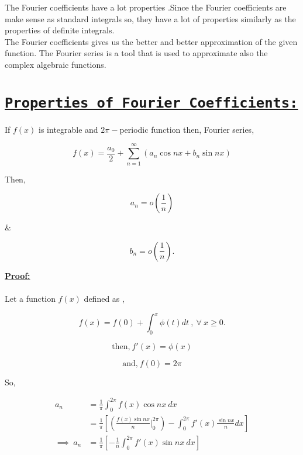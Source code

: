 \documentclass[a4paper,12pt]{article}
\begin{document}
        The Fourier coefficients have a lot properties .Since the Fourier coefficients are make sense as standard integrals so, they have a lot of properties similarly as the properties of definite integrals.\\

        The Fourier coefficients gives us the better and better approximation of the given function. The Fourier series is a tool that is used to approximate also the complex algebraic functions.

        \pagebreak

        \section*{\underline{\texttt{\textbf {Properties of Fourier Coefficients:}}}}

        If $f(x)$ is integrable and $2\pi-$periodic function then, Fourier series,

        $$f(x) = \frac{a_{0}}{2} + \sum_{n=1}^{\infty}\left(a_{n}\cos nx + b_{n}\sin nx\right)$$

        Then,

        $$a_{n} = o\left(\frac{1}{n}\right)$$

        \&

        $$b_{n} = o\left(\frac{1}{n}\right).$$

        \textbf{\underline{Proof:}}

        \paragraph*{}

        Let a function $f(x)$ defined as ,

        $$f(x) = f(0) + \int_{0}^{x}\phi(t)dt\ ,\  \forall\ x \geq 0.$$

        $$\mbox{then,}\ f'(x) = \phi(x) $$

        $$\mbox{and,}\ f(0) = 2\pi$$

        So,

        \begin{center}
            \begin{equation*}
                \begin{split}
                    a_{n} & = \frac{1}{\pi}\int_{0}^{2\pi}f(x)\cos nx \ dx\\[2.5mm]
                    & = \frac{1}{\pi}\left[\left(\frac{f(x)\sin nx}{n}\bigg|_{0}^{2\pi}\right) - \int_{0}^{2\pi}f'(x)\frac{\sin nx}{n}dx\right]\\[2.5mm]
                    \implies\ a_{n} & = \frac{1}{\pi}\left[-\frac{1}{n}\int_{0}^{2\pi}f'(x)\sin nx \ dx\right]
                \end{split}
            \end{equation*}
        \end{center}
\end{document}
